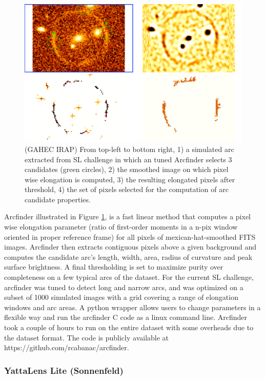\documentclass{aa}
\begin{document}
\begin{figure}
 \includegraphics[width=\columnwidth]{figures/arcmethod.pdf}
 \caption{ (GAHEC IRAP) From top-left to bottom right, 1) a simulated arc extracted from SL challenge in which an tuned Arcfinder selects 3 candidates (green circles), 2) the smoothed image on which pixel wise elongation is computed, 3) the resulting elongated pixels after threshold, 4) the set of pixels selected for the computation of arc candidate properties. }
 \label{fig:Cabanac}
\end{figure}

Arcfinder \citep{2006astro.ph..6757A,2007AandA...461..813C,2012ApJ...749...38M} illustrated in Figure \ref{fig:Cabanac}, is a fast linear method that computes a pixel wise elongation parameter (ratio of first-order moments in a n-pix window oriented in proper reference frame) for all pixels of mexican-hat-smoothed FITS images. Arcfinder then extracts contiguous pixels above a given background and computes the candidate arc's length, width, area, radius of curvature and peak surface brightness. A final thresholding is set to maximize purity over completeness on a few typical arcs of the dataset.
For the current SL challenge, arcfinder was tuned to detect long and narrow arcs, and was optimized on a subset of 1000 simulated images with a grid covering a range of elongation windows and arc areas.  A python wrapper allows users to change parameters in a flexible way and run the arcfinder C code as a linux  command line. Arcfinder took a couple of hours to run on the entire dataset with some overheads due to the dataset format. The code is publicly available at https://github.com/rcabanac/arcfinder.

\subsubsection{YattaLens Lite (Sonnenfeld)}
\end{document}
